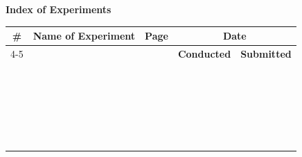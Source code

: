 \documentclass[12pt]{report}
\begin{document}
\thispagestyle{empty}
\titleGP
\clearpage

\thispagestyle{empty}
\begin{center}
	{\huge\textbf{Index of Experiments}} \\[1em]
	\hrulefill
\end{center}
\vspace{1cm}

\begin{table}[H]
	\centering
	\begin{tabular}{|c|p{7.8cm}|c|c|c|}
		\hline
		\multirow{2}{*}{\textbf{\#}}& \multirow{2}{*}{\textbf{Name of Experiment}}& \multirow{2}{*}{\textbf{Page}}& \multicolumn{2}{|c|}{\textbf{Date}}\\ \cline{4-5}
					    & & &\textbf{Conducted}& \textbf{Submitted}\\ \hline
		&&&&\\
		&&&&\\ \hline
		&&&&\\
		&&&&\\ \hline
		&&&&\\
		&&&&\\ \hline
		&&&&\\
		&&&&\\ \hline
		&&&&\\
		&&&&\\ \hline
		&&&&\\
		&&&&\\ \hline
		&&&&\\
		&&&&\\ \hline
		&&&&\\
		&&&&\\ \hline
		&&&&\\
		&&&&\\ \hline
		&&&&\\
		&&&&\\ \hline
		&&&&\\
		&&&&\\ \hline
		&&&&\\
		&&&&\\ \hline
	\end{tabular}
\end{table}

\pagestyle{fancy}

\clearpage












\end{document}

